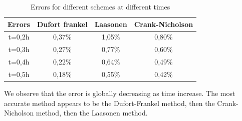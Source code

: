 \documentclass{article}
\begin{document}
        \begin{table}[H]
            \centering
            \caption{Errors for different schemes at different times}
            \begin{tabular}{|c|c|c|c|}
            \hline
            Errors & Dufort frankel & Laasonen & Crank-Nicholson \\ \hline
            t=0,2h & 0,37\%         & 1,05\%   & 0,80\%          \\ \hline
            t=0,3h & 0,27\%         & 0,77\%   & 0,60\%          \\ \hline
            t=0,4h & 0,22\%         & 0,64\%   & 0,49\%          \\ \hline
            t=0,5h & 0,18\%         & 0,55\%   & 0,42\%          \\ \hline
            \end{tabular}
        \end{table}

        We observe that the error is globally decreasing as time increase. The most accurate method appears to 
        be the Dufort-Frankel method, then the Crank-Nicholson method, then the Laasonen method.
\end{document}
